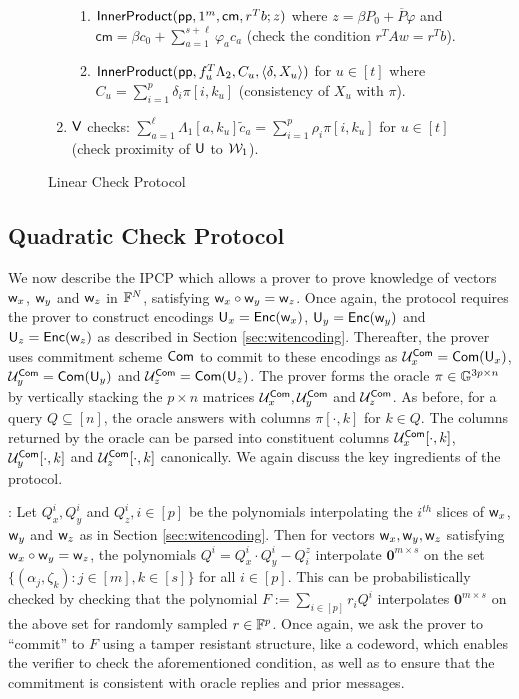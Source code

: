 \begin{figure}[t!]
\begin{framed}
\begin{enumerate}[{\rm 1.}]
\begin{enumerate}
\item $\mathsf{InnerProduct}(\mathsf{pp},1^m,\mathsf{cm},r^Tb;z)$ where $z=\beta P_0+\overline{P}\varphi$ and $\mathsf{cm}=\beta c_0+\sum_{a=1}^{s+\ell}\varphi_ac_a$ (check the condition $r^TAw=r^Tb$).
\item $\mathsf{InnerProduct}(\mathsf{pp},f_u^T\Lambda_2,C_u,\langle \delta,X_u\rangle)$ for $u\in [t]$ 
where $C_u=\sum_{i=1}^p\delta_i\pi[i,k_u]$ (consistency of $X_u$ with $\pi$). 
\end{enumerate}
\item $\mathsf{V}$ checks: $\sum_{a=1}^\ell\Lambda_1[a,k_u]\tilde{c}_a=\sum_{i=1}^p\rho_i\pi[i,k_u]$ for $u\in [t]$ (check proximity of $\mathsf{U}$ to $\mathcal{W}_1$).
\end{enumerate}
\end{framed}
\caption{Linear Check Protocol}
\label{fig:linearcheck}
\end{figure}


\subsection{Quadratic Check Protocol}
We now describe the IPCP which allows a prover to prove knowledge of vectors
$\mathsf{w}_x$, $\mathsf{w}_y$ and $\mathsf{w}_z$ in $\mathbb{F}^N$, satisfying $\mathsf{w}_x\circ \mathsf{w}_y =
\mathsf{w}_z$. Once again, the protocol requires the prover to construct encodings
$\mathsf{U}_x=\mathsf{Enc}(\mathsf{w}_x)$, $\mathsf{U}_y=\mathsf{Enc}(\mathsf{w}_y)$ and $\mathsf{U}_z=\mathsf{Enc}(\mathsf{w}_z)$ as
described in Section \ref{sec:witencoding}. Thereafter, the prover uses
commitment scheme $\mathsf{Com}$ to commit to these encodings as $\mathcal{U}^{\mathsf{Com}}_x =
\mathsf{Com}(\mathsf{U}_x)$, $\mathcal{U}^{\mathsf{Com}}_y = \mathsf{Com}(\mathsf{U}_y)$ and $\mathcal{U}^{\mathsf{Com}}_z = \mathsf{Com}(\mathsf{U}_z)$. 
The prover forms the oracle $\pi\in \mathbb{G}^{3p\times n}$ by vertically stacking the
$p\times n$ matrices $\mathcal{U}^{\mathsf{Com}}_x,\mathcal{U}^{\mathsf{Com}}_y$ and $\mathcal{U}^{\mathsf{Com}}_z$. As before,
for a query $Q\subseteq [n]$, the oracle answers with columns $\pi[\cdot,k]$ for
$k\in Q$. The columns returned by the oracle can be parsed into constituent columns 
$\mathcal{U}^{\mathsf{Com}}_x[\cdot,k]$, $\mathcal{U}^{\mathsf{Com}}_y[\cdot,k]$ and $\mathcal{U}^{\mathsf{Com}}_z[\cdot,k]$
canonically. We again discuss the key ingredients of the protocol.

: Let $Q^i_x,Q^i_y$ and $Q^i_z, i\in [p]$ be the
polynomials interpolating the $i^{th}$ slices of $\mathsf{w}_x$, $\mathsf{w}_y$ and $\mathsf{w}_z$
 as in Section \ref{sec:witencoding}. Then for vectors $\mathsf{w}_x,\mathsf{w}_y,\mathsf{w}_z$ satisfying
$\mathsf{w}_x\circ \mathsf{w}_y=\mathsf{w}_z$, the polynomials $Q^i=Q^i_x\cdot Q^i_y - Q^z_i$ interpolate
$\bm{0}^{m\times s}$ on the set $\{(\alpha_j,\zeta_k):j\in [m],k\in [s]\}$ for all $i\in [p]$. This can be probabilistically
checked by checking that the polynomial $F := \sum_{i\in [p]}r_iQ^i$ interpolates
$\bm{0}^{m\times s}$ on the above set for randomly sampled $r\in \mathbb{F}^p$. Once again, we
ask the prover to ``commit'' to $F$ using a tamper resistant structure, like a codeword,
which enables the verifier to check the aforementioned condition, as well as to
ensure that the commitment is consistent with oracle replies and prior
messages.

